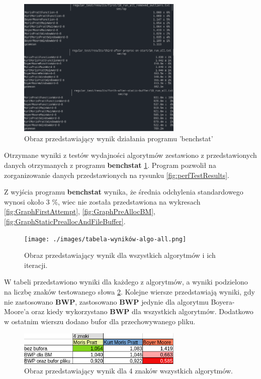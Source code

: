 \begin{figure}[htb]
    \centering
    \includegraphics[width=0.7\textwidth]{./images/benchstat-results-sumup.png}
    \caption{Obraz przedstawiający wynik działania programu 'benchstat'}
    \label{fig:benchstatResults}
\end{figure}

Otrzymane wyniki z testów wydajności algorytmów zestawiono z przedstawionych
danych otrzymanych z programu \textbf{benchstat} \ref{fig:benchstatResults}.
Program pozwolił na zorganizowanie 
danych przedstawionych na rysunku \ref{fig:perfTestResults}.

Z wyjścia programu \textbf{benchstat} wynika, że średnia odchylenia standardowego
wynosi około 3 \%, wiec nie została przedstawiona na wykresach 
\ref{fig:GraphFirstAttempt}, 
\ref{fig:GraphPreAllocBM},
\ref{fig:GraphStaticPreallocAndFileBuffer}.

\begin{figure}[htb]
    \centering
    \texttt{[image: ./images/tabela-wyników-algo-all.png]}
    \caption{Obraz przedstawiający wynik dla wszystkich algorytmów i ich iteracji.}
    \label{fig:algoAllTabela}
\end{figure}

W tabeli przedstawiono wyniki dla każdego z algorytmów, a wyniki podzielono
na liczbę znaków testowanego słowa \ref{fig:algoAllTabela}. Kolejne wiersze
przedstawiają wyniki, gdy nie zastosowano \textbf{BWP}, zastosowano \textbf{BWP}
jedynie dla algorytmu Boyera-Moore'a oraz kiedy wykorzystano \textbf{BWP} dla
wszystkich algorytmów. Dodatkowo w ostatnim wierszu dodano bufor dla 
przechowywanego pliku. 

\begin{figure}[htb]
    \centering
    \includegraphics[width=0.7\textwidth]{./images/tabela-algo-4-znaki.png}
    \caption{Obraz przedstawiający wynik dla 4 znaków wszystkich algorytmów.}
    \label{fig:algo4znakiTabela}
\end{figure}

